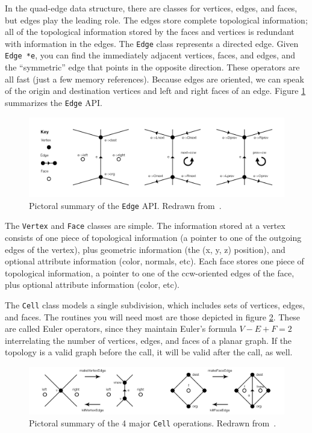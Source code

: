 In the quad-edge data structure, there are classes for vertices, edges, and
faces, but edges play the leading role. The edges store complete topological
information; all of the topological information stored by the faces and vertices
is redundant with information in the edges. The \texttt{Edge} class represents a
directed edge. Given \texttt{Edge *e}, you can find the immediately adjacent
vertices, faces, and edges, and the ``symmetric'' edge that points in the
opposite direction. These operators are all fast (just a few memory references).
Because edges are oriented, we can speak of the origin and destination vertices
and left and right faces of an edge. Figure \ref{fig:quadedge-edge-api}
summarizes the \texttt{Edge} API.

\begin{figure}[h]
	\centering
	\includegraphics[width=\textwidth]{figures/quadedge-edge-api} 
	\caption{Pictoral summary of the \texttt{Edge} API. Redrawn
	from~\cite{heckbert}.}
	\label{fig:quadedge-edge-api} 
\end{figure}

The \texttt{Vertex} and \texttt{Face} classes are simple. The information stored
at a vertex consists of one piece of topological information (a pointer to one
of the outgoing edges of the vertex), plus geometric information (the (x, y, z)
position), and optional attribute information (color, normals, etc). Each face
stores one piece of topological information, a pointer to one of the
ccw-oriented edges of the face, plus optional attribute information (color, etc).

The \texttt{Cell} class models a single subdivision, which includes sets of
vertices, edges, and faces. The routines you will need most are those depicted
in figure \ref{fig:quadedge-cell-api}. These are called Euler operators, since
they maintain Euler's formula $V-E+F=2$ interrelating the number of vertices,
edges, and faces of a planar graph. If the topology is a valid graph before the
call, it will be valid after the call, as well.

\begin{figure}[h]
	\centering
	\includegraphics[width=\textwidth]{figures/quadedge-cell-api} 
	\caption{Pictoral summary of the 4 major \texttt{Cell} operations. Redrawn
	from~\cite{heckbert}.}
	\label{fig:quadedge-cell-api}  
\end{figure}
 
